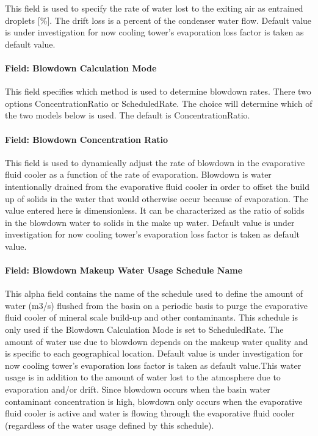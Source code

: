 This field is used to specify the rate of water lost to the exiting air as entrained droplets {[}\%{]}. The drift loss is a percent of the condenser water flow. Default value is under investigation for now cooling tower's evaporation loss factor is taken as default value.

\paragraph{Field: Blowdown Calculation Mode}\label{field-blowdown-calculation-mode-4}

This field specifies which method is used to determine blowdown rates. There two options ConcentrationRatio or ScheduledRate. The choice will determine which of the two models below is used. The default is ConcentrationRatio.

\paragraph{Field: Blowdown Concentration Ratio}\label{field-blowdown-concentration-ratio-4}

This field is used to dynamically adjust the rate of blowdown in the evaporative fluid cooler as a function of the rate of evaporation. Blowdown is water intentionally drained from the evaporative fluid cooler in order to offset the build up of solids in the water that would otherwise occur because of evaporation. The value entered here is dimensionless. It can be characterized as the ratio of solids in the blowdown water to solids in the make up water. Default value is under investigation for now cooling tower's evaporation loss factor is taken as default value.

\paragraph{Field: Blowdown Makeup Water Usage Schedule Name}\label{field-blowdown-makeup-water-usage-schedule-name-4}

This alpha field contains the name of the schedule used to define the amount of water (m3/s) flushed from the basin on a periodic basis to purge the evaporative fluid cooler of mineral scale build-up and other contaminants. This schedule is only used if the Blowdown Calculation Mode is set to ScheduledRate. The amount of water use due to blowdown depends on the makeup water quality and is specific to each geographical location. Default value is under investigation for now cooling tower's evaporation loss factor is taken as default value.This water usage is in addition to the amount of water lost to the atmosphere due to evaporation and/or drift. Since blowdown occurs when the basin water contaminant concentration is high, blowdown only occurs when the evaporative fluid cooler is active and water is flowing through the evaporative fluid cooler (regardless of the water usage defined by this schedule).

